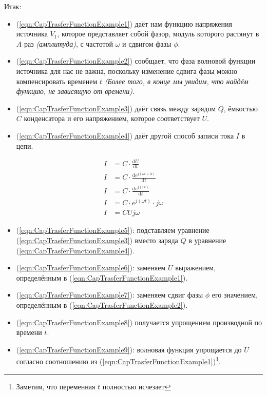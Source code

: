 \documentclass[a4paper, 10pt, final]{article} %
\begin{document}
    \noindent Итак:
    \begin{itemize}
        \item (\ref{eqn:CapTrasferFunctionExample1}) даёт нам функцию напряжения источника $V_1$, которое представляет собой
        фазор, модуль которого растянут в $A$ раз \emph{(амплитуда)}, с частотой $\omega$ и сдвигом фазы $\phi$.
        \item (\ref{eqn:CapTrasferFunctionExample2}) сообщает, что фаза волновой функции источника для нас не важна, поскольку изменение сдвига фазы можно компенсировать временем $t$ \emph{(Более того, в конце мы увидим, что найдём функцию, не зависящую от времени)}.
        \item (\ref{eqn:CapTrasferFunctionExample3}) даёт связь между зарядом $Q$, ёмкостью $C$ конденсатора и его напряжением, которое соответствует $U$.
        \item (\ref{eqn:CapTrasferFunctionExample4}) даёт другой способ записи тока $I$ в цепи.
    \end{itemize} 
    \begin{align}
        I &= C \cdot \frac{\textrm{d}U}{\textrm{d}t} \label{eqn:CapTrasferFunctionExample5} \\
        I &= C \cdot \frac{\textrm{d}e^{j \left( \omega t + \phi \right)}}{\textrm{d}t} \label{eqn:CapTrasferFunctionExample6} \\
        I &= C \cdot \frac{\textrm{d}e^{j \left( \omega t\right)}}{\textrm{d}t} \label{eqn:CapTrasferFunctionExample7} \\
        I &= C \cdot e^{j \left( \omega t \right)} \cdot j \omega \label{eqn:CapTrasferFunctionExample8} \\
        I &= C U j \omega \label{eqn:CapTrasferFunctionExample9}
    \end{align}
    \begin{itemize}
        \item (\ref{eqn:CapTrasferFunctionExample5}): подставляем уравнение (\ref{eqn:CapTrasferFunctionExample3}) вместо заряда $Q$ в уравнение (\ref{eqn:CapTrasferFunctionExample4}).
        \item (\ref{eqn:CapTrasferFunctionExample6}): заменяем $U$ выражением, определённым в (\ref{eqn:CapTrasferFunctionExample1}).
        \item (\ref{eqn:CapTrasferFunctionExample7}): заменяем сдвиг фазы $\phi$ его значением, определённым в (\ref{eqn:CapTrasferFunctionExample2}).
        \item (\ref{eqn:CapTrasferFunctionExample8}) получается упрощением производной по времени $t$.
        \item (\ref{eqn:CapTrasferFunctionExample9}): волновая функция упрощается до $U$ согласно соотношению из (\ref{eqn:CapTrasferFunctionExample1})\footnote{Заметим, что переменная $t$ полностью исчезает}.
    \end{itemize}
\end{document}
